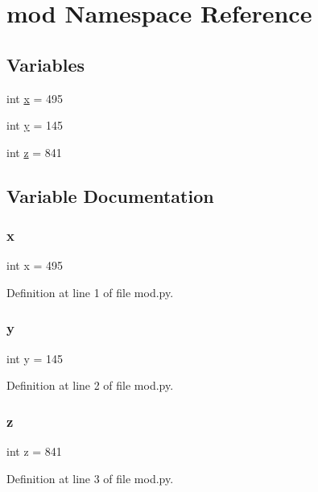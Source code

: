 \hypertarget{namespacemod}{}\section{mod Namespace Reference}
\label{namespacemod}
\subsection*{Variables}
\begin{DoxyCompactItemize}
\item 
int \hyperlink{namespacemod_a6150e0515f7202e2fb518f7206ed97dc}{x} = 495
\item 
int \hyperlink{namespacemod_a0a2f84ed7838f07779ae24c5a9086d33}{y} = 145
\item 
int \hyperlink{namespacemod_a14f94e529dff0b8bfba8e16fbe9755d6}{z} = 841
\end{DoxyCompactItemize}


\subsection{Variable Documentation}
\mbox{\label{namespacemod_a6150e0515f7202e2fb518f7206ed97dc}} 
\subsubsection{\texorpdfstring{x}{x}}
{\footnotesize\ttfamily int x = 495}



Definition at line 1 of file mod.\+py.

\mbox{\label{namespacemod_a0a2f84ed7838f07779ae24c5a9086d33}} 
\subsubsection{\texorpdfstring{y}{y}}
{\footnotesize\ttfamily int y = 145}



Definition at line 2 of file mod.\+py.

\mbox{\label{namespacemod_a14f94e529dff0b8bfba8e16fbe9755d6}} 
\subsubsection{\texorpdfstring{z}{z}}
{\footnotesize\ttfamily int z = 841}



Definition at line 3 of file mod.\+py.

